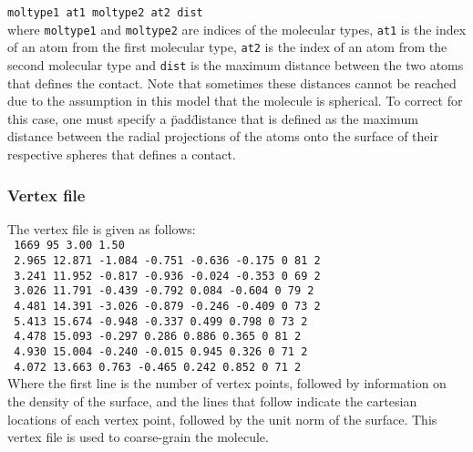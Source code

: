 \texttt{moltype1  at1 moltype2 at2 dist}\\

where \texttt{moltype1} and \texttt{moltype2} are indices of the molecular types, \texttt{at1} is the index of an atom from the first 
molecular type, \texttt{at2} is the index of an atom from the second molecular type and \texttt{dist} is the maximum distance between
the two atoms that defines the contact.  Note that sometimes these distances cannot be reached due to the assumption in this model that 
the molecule is spherical. To correct for this case, one must specify a \"pad\"  distance that is defined as the maximum distance between 
the radial projections of the atoms onto the surface of their respective spheres that defines a contact.

\subsubsection{Vertex file}

The vertex file is given as follows: \\ 

\texttt{   1669      95  3.00  1.50} \\
\texttt{    2.965    12.871    -1.084    -0.751    -0.636    -0.175       0      81  2 } \\
\texttt{    3.241    11.952    -0.817    -0.936    -0.024    -0.353       0      69  2 } \\
\texttt{    3.026    11.791    -0.439    -0.792     0.084    -0.604       0      79  2 } \\
\texttt{    4.481    14.391    -3.026    -0.879    -0.246    -0.409       0      73  2 } \\
\texttt{    5.413    15.674    -0.948    -0.337     0.499     0.798       0      73  2 } \\
\texttt{    4.478    15.093    -0.297     0.286     0.886     0.365       0      81  2} \\
\texttt{    4.930    15.004    -0.240    -0.015     0.945     0.326       0      71  2} \\
\texttt{    4.072    13.663     0.763    -0.465     0.242     0.852       0      71  2 } \\

Where the first line is the number of vertex points, followed by information on the density of the surface, and the lines that follow indicate the cartesian locations of each vertex point, followed by the unit norm of the surface. This vertex file is used to coarse-grain the molecule.


